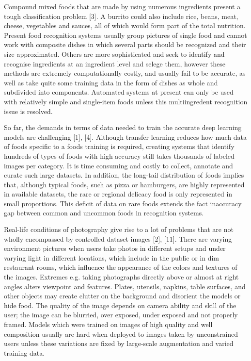 \documentclass[12pt, openany]{report}
\begin{document}
Compound mixed foods that are made by using numerous ingredients present a tough classification problem [3]. A burrito could also include rice, beans, meat, cheese, vegetables and sauces, all of which would form part of the total nutrition. Present food recognition systems usually group pictures of single food and cannot work with composite dishes in which several parts should be recognized and their size approximated. Others are more sophisticated and seek to identify and recognise ingredients at an ingredient level and selege them, however these methods are extremely computationally costly, and usually fail to be accurate, as well as take quite some training data in the form of dishes as whole and subdivided into components. Automated systems at present can only be used with relatively simple and single-item foods unless this multiingredent recognition issue is resolved.

So far, the demands in terms of data needed to train the accurate deep learning models are challenging [1], [4]. Although transfer learning reduces how much data of foods specific to a foods training is required, creating systems that identify hundreds of types of foods with high accuracy still takes thousands of labeled images per category. It is time consuming and costly to collect, annotate and curate such large datasets. In addition, the long-tail distribution of foods implies that, although typical foods, such as pizza or hamburgers, are highly represented in available datasets, the rare or regional delicacy food is only represented in small proportions. This deficit of data on rare foods extends the fact inaccuracy gap between common and uncommon foods in recognition systems.

Real-life conditions of photography give rise to a lot of problems that are not wholly encompassed by controlled dataset images [2], [11]. There are varying environment pictures when users take photos in different setups and under varying light in different locations, which include in the public or in dim restaurant rooms, which influence the appearance of the colors and textures of the images. Extremes e.g. taking photographs directly above or almost at right angles alters viewpoint and features. Plates, utensils, napkins, table surfaces, and other objects may create clutter on the background and disorient the models or hide food. The quality of the image depends on camera ability and skill of the user; the image can be blurried, over exposed, under exposed and not properly framed. Models which were trained on images of high quality and well composition usually are hard when deployed to images taken by unconstrained users unless these variations are fixed by large-scale augmentation and varied training data.
\end{document}
